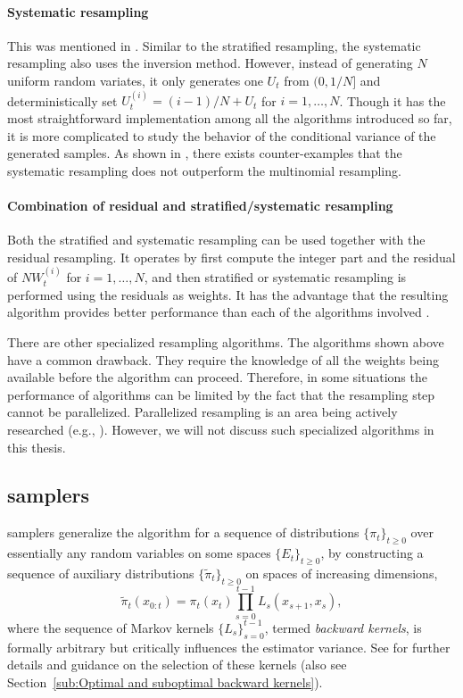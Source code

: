 \paragraph{Systematic resampling}

This was mentioned in \cite{Whitley:1994vx}. Similar to the stratified resampling, the systematic resampling also uses the inversion method. However, instead of generating $N$ uniform random variates, it only generates one $U_t$ from $(0, 1/N]$ and deterministically set $U_t^{(i)} = (i - 1)/N + U_t$ for $i = 1,\dots,N$. Though it has the most straightforward implementation among all the algorithms introduced so far, it is more complicated to study the behavior of the conditional variance of the generated samples. As shown in \cite{Douc:2005wa}, there exists counter-examples that the systematic resampling does not outperform the multinomial resampling.

\paragraph{Combination of residual and stratified/systematic resampling}

Both the stratified and systematic resampling can be used together with the residual resampling. It operates by first compute the integer part and the residual of $NW_t^{(i)}$ for $i = 1,\dots,N$, and then stratified or systematic resampling is performed using the residuals as weights. It has the advantage that the resulting algorithm provides better performance than each of the algorithms involved \cite{Douc:2005wa}.

There are other specialized resampling algorithms. The algorithms shown above have a common drawback. They require the knowledge of all the weights being available before the algorithm can proceed. Therefore, in some situations the performance of \smc algorithms can be limited by the fact that the resampling step cannot be parallelized. Parallelized resampling is an area being actively researched (e.g., \cite{Jun:2011vx,Murray:2013vx}). However, we will not discuss such specialized algorithms in this thesis.

\subsection[SMC samplers]{\protect\smc samplers}
\label{sub:SMC Samplers}

\smc samplers generalize the \sis algorithm for a sequence of distributions $\{\pi_t\}_{t\ge0}$ over essentially any random variables on some spaces $\{E_t\}_{t\ge0}$, by constructing a sequence of auxiliary distributions $\{\tilde\pi_t\}_{t\ge0}$ on spaces of increasing dimensions,
\begin{equation}
  \tilde\pi_t(x_{0:t})=\pi_t (x_t) \prod_{s=0}^{t-1} L_s(x_{s+1},x_s),
\end{equation}
where the sequence of Markov kernels $\{L_s\}_{s=0}^{t-1}$, termed \emph{backward kernels}, is formally arbitrary but critically influences the estimator variance. See \cite{DelMoral:2006hc} for further details and guidance on the selection of these kernels (also see Section~\ref{sub:Optimal and suboptimal backward kernels}).

